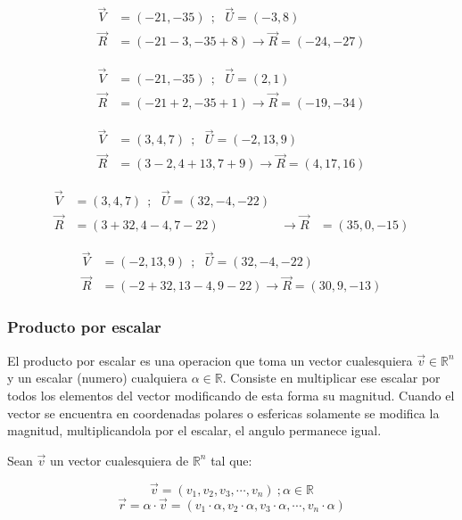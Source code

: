     \begin{align*}
        \vec{V}& =(-21,-35)  \ \ ;\ \ \  \vec{U} =(-3,8)		\\
        \vec{R}&= (-21-3 ,-35+8  )  \rightarrow \vec{R} = (-24 ,-27  )
    \end{align*}

    \begin{align*}
        \vec{V}& =(-21,-35)  \ \ ;\ \ \  \vec{U} =(2,1)		\\
        \vec{R}&= (-21+2 , -35+1 )   \rightarrow \vec{R} = (-19 ,-34  )
    \end{align*}




    \begin{align*}
        \vec{V}& =(3,4,7)  \ \ ;\ \ \   \vec{U} =(-2,13,9)		\\
        \vec{R}&= (3-2 ,4+13 ,7+9 )   \rightarrow \vec{R} = (4,17,16 )
    \end{align*}

    \begin{align*}
        \vec{V}& =(3,4,7)  \ \ ;\ \ \  \vec{U} =(32,-4,-22)		\\
        \vec{R}&= (3+32, 4-4,7-22 )  & \rightarrow \vec{R} &= ( 35,0 ,-15 )
    \end{align*}

    \begin{align*}
        \vec{V}& =(-2,13,9)  \ \ ;\ \ \   \vec{U} =(32,-4,-22)		\\
        \vec{R}&= (-2+32 ,13-4 ,9-22 )  \rightarrow \vec{R} = (30, 9,-13 )
    \end{align*}


    \subsubsection{Producto por escalar}

    El producto por escalar es una operacion que toma un vector cualesquiera
    $\vec{v} \in \mathbb{R}^n$ y un escalar (numero) cualquiera $\alpha \in
    \mathbb{R}$. Consiste en multiplicar ese escalar por todos los elementos del
    vector modificando de esta forma su magnitud. Cuando el vector se encuentra
    en coordenadas polares o esfericas solamente se modifica la magnitud,
    multiplicandola por el escalar, el angulo permanece igual.

    Sean $\vec{v}$ un  vector cualesquiera de $\mathbb{R}^n$  tal que:

    $$\vec{v}=(v_1,v_2,v_3,\cdots,v_n)\ ; \alpha \in \mathbb{R} $$
    $$\vec{r}=\alpha\cdot\vec{v}=(v_1\cdot\alpha,v_2\cdot\alpha,v_3\cdot\alpha,\cdots,v_n\cdot\alpha)$$

